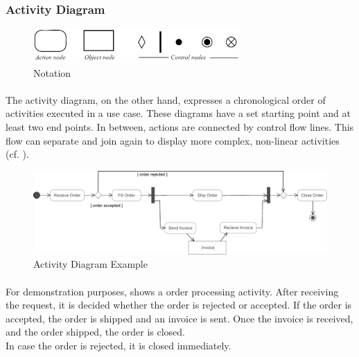 \subsubsection{Activity Diagram}

\begin{figure}[H]
    \centering
    \includegraphics[width=0.7\textwidth]{img/ActivitySymbols.pdf}
    \caption{Notation}\label{fig:adSymb}
\end{figure}

\paragraph{} The activity diagram, on the other hand, expresses a chronological order of activities executed in a use case. These diagrams have a set starting point and at least two end points. In between, actions are connected by control flow lines. This flow can separate and join again to display more complex, non-linear activities  (cf. ).

\begin{figure}[H]
    \centering
    \includegraphics[width=\textwidth]{img/ActivityExample.pdf}
    \caption{Activity Diagram Example \parencite[380]{ObjectManagementGroup.01.03.2015}}\label{fig:adEx}
\end{figure}

\paragraph{} For demonstration purposes,  shows a order processing activity. After receiving the request, it is decided whether the order is rejected or accepted. If the order is accepted, the order is shipped and an invoice is sent. Once the invoice is received, and the order shipped, the order is closed. \\
In case the order is rejected, it is closed immediately. 

